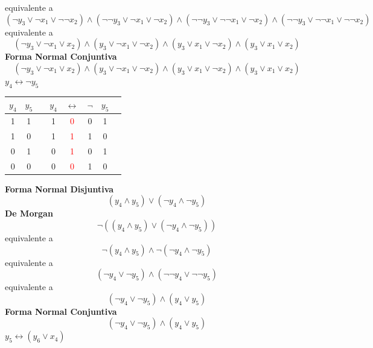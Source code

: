 \documentclass[a4paper]{article}
\begin{document}
equivalente a
\[
    \left(\neg y_{3} \lor \neg x_{1} \lor \neg \neg x_{2}\right) \land \left(\neg \neg y_{3} \lor \neg x_{1} \lor \neg x_{2}\right) \land
    \left(\neg \neg y_{3} \lor \neg \neg x_{1} \lor \neg x_{2}\right) \land \left(\neg \neg y_{3} \lor \neg \neg x_{1} \lor \neg \neg x_{2}\right)
\]
equivalente a
\[
    \left(\neg y_{3} \lor \neg x_{1} \lor x_{2}\right) \land \left(y_{3} \lor \neg x_{1} \lor \neg x_{2}\right) \land
    \left(y_{3} \lor x_{1} \lor \neg x_{2}\right) \land \left(y_{3} \lor x_{1} \lor x_{2}\right)
\]
\textbf{Forma Normal Conjuntiva}
\[
    \left(\neg y_{3} \lor \neg x_{1} \lor x_{2}\right) \land \left(y_{3} \lor \neg x_{1} \lor \neg x_{2}\right) \land
    \left(y_{3} \lor x_{1} \lor \neg x_{2}\right) \land \left(y_{3} \lor x_{1} \lor x_{2}\right) %
\]
\(y_{4} \longleftrightarrow \neg y_{5}\)
\newline
\begin{tabular}{@{ }c@{ }@{ }c | c@{ }@{ }c@{ }@{ }c@{ }@{ }c@{ }@{ }c@{ }@{ }c}
    \(y_{4}\) & \(y_{5}\) &  & \(y_{4}\) & $\leftrightarrow$ & $\lnot$ & \(y_{5}\) & \\
    \hline 
    1 & 1 &  & 1 & \textcolor{red}{0} & 0 & 1 & \\
    1 & 0 &  & 1 & \textcolor{red}{1} & 1 & 0 & \\
    0 & 1 &  & 0 & \textcolor{red}{1} & 0 & 1 & \\
    0 & 0 &  & 0 & \textcolor{red}{0} & 1 & 0 & \\
\end{tabular}
\newline
\textbf{Forma Normal Disjuntiva}
\[
    \left(y_{4} \land y_{5}\right) \lor \left(\neg y_{4} \land \neg y_{5}\right)
\]
\textbf{De Morgan}
\[
    \neg \left(\left(y_{4} \land y_{5}\right) \lor \left(\neg y_{4} \land \neg y_{5}\right)\right)
\]
equivalente a
\[
    \neg \left(y_{4} \land y_{5}\right) \land \neg \left(\neg y_{4} \land \neg y_{5}\right)
\]
equivalente a
\[
    \left(\neg y_{4} \lor \neg y_{5}\right) \land \left(\neg \neg y_{4} \lor \neg \neg y_{5}\right)
\]
equivalente a
\[
    \left(\neg y_{4} \lor \neg y_{5}\right) \land \left(y_{4} \lor y_{5}\right)
\]
\textbf{Forma Normal Conjuntiva}
\[
    \left(\neg y_{4} \lor \neg y_{5}\right) \land \left(y_{4} \lor y_{5}\right) %
\]
\(y_{5} \longleftrightarrow \left(y_{6} \lor x_{4}\right)\)
\newline
\end{document}
